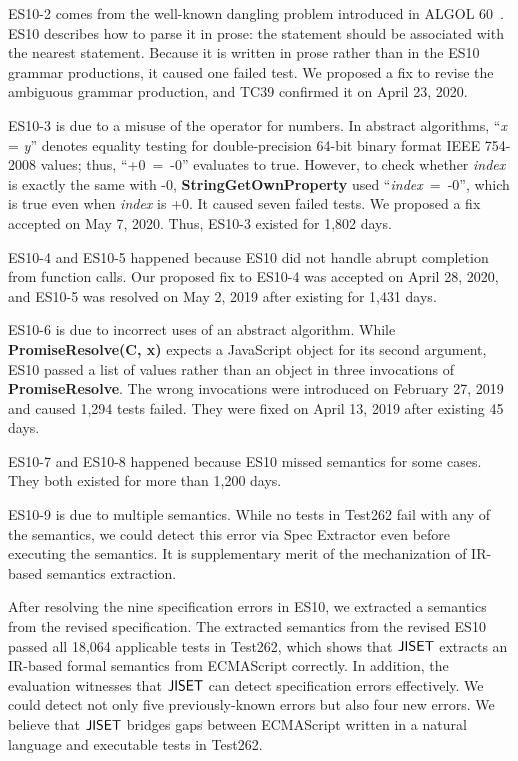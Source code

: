 ES10-2 comes from the well-known dangling  problem
introduced in ALGOL 60~\cite{dangling-else}.  ES10 describes how to
parse it in prose: the  statement should be associated with
the nearest  statement.  Because it is written in prose
rather than in the ES10 grammar productions, it caused one failed
test.  We proposed a fix to revise the ambiguous grammar production,
and TC39 confirmed it on April 23, 2020.

ES10-3 is due to a misuse of the \code{=} operator for numbers.
In abstract algorithms, ``{\it x} = {\it y}'' denotes equality testing
for double-precision 64-bit binary format IEEE 754-2008 values;
thus, \mbox{``+0 = -0''} evaluates to true.  However, to check whether
{\it index} is exactly the same with -0,
{\bf StringGetOwnProperty} used \mbox{``{\it index} = -0''},
which is true even when {\it index} is +0.
It caused seven failed tests. We proposed a fix accepted on May 7, 2020.
Thus, ES10-3 existed for 1,802 days.

ES10-4 and ES10-5 happened because ES10 did not handle
abrupt completion from function calls.  Our proposed fix to ES10-4 was
accepted on April 28, 2020, and ES10-5 was resolved on May 2, 2019
after existing for 1,431 days.

ES10-6 is due to incorrect uses of an abstract algorithm.
While {\bf PromiseResolve(C, x)} expects a JavaScript object for its
second argument, ES10 passed a list of values rather than an object in
three invocations of {\bf PromiseResolve}.  The wrong invocations were
introduced on February 27, 2019 and caused 1,294 tests failed.
They were fixed on April 13, 2019 after existing 45 days.

ES10-7 and ES10-8 happened because ES10 missed semantics for some
cases.  They both existed for more than 1,200 days.

ES10-9 is due to multiple semantics.  While no tests in Test262 fail
with any of the semantics, we could detect this error via {\sf Spec
Extractor} even before executing the semantics. It is supplementary merit of
the mechanization of IR-based semantics extraction.

After resolving the nine specification errors in ES10, we extracted a
semantics from the revised specification.  The extracted semantics
from the revised ES10 passed all 18,064 applicable tests in Test262,
which shows that \( \text{\sf JISET} \) extracts an IR-based formal semantics
from ECMAScript correctly.  In addition, the evaluation witnesses that
\( \text{\sf JISET} \) can detect specification errors effectively.
We could detect not only five previously-known errors
but also four new errors.  We believe that \( \text{\sf JISET} \) bridges gaps
between ECMAScript written in a natural language and executable tests
in Test262.


